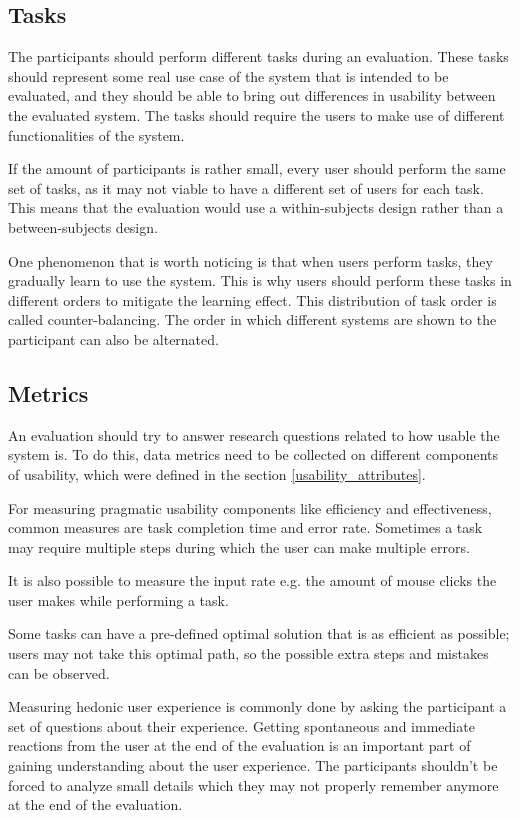 \subsection{Tasks}
The participants should perform different tasks during an evaluation. These tasks should represent some real use case of the system that is intended to be evaluated, and they should be able to bring out differences in usability between the evaluated system. The tasks should require the users to make use of different functionalities of the system.

If the amount of participants is rather small, every user should perform the same set of tasks, as it may not viable to have a different set of users for each task. This means that the evaluation would use a within-subjects design rather than a between-subjects design. 

One phenomenon that is worth noticing is that when users perform tasks, they gradually learn to use the system. This is why users should perform these tasks in different orders to mitigate the learning effect. This distribution of task order is called counter-balancing. The order in which different systems are shown to the participant can also be alternated. \cite{rubin2008handbook}

\subsection{Metrics}
An evaluation should try to answer research questions related to how usable the system is. To do this, data metrics need to be collected on different components of usability, which were defined in the section \ref{usability_attributes}.

For measuring pragmatic usability components like efficiency and effectiveness, common measures are task completion time and error rate. Sometimes a task may require multiple steps during which the user can make multiple errors. 

It is also possible to measure the input rate e.g. the amount of mouse clicks the user makes while performing a task.

Some tasks can have a pre-defined optimal solution that is as efficient as possible; users may not take this optimal path, so the possible extra steps and mistakes can be observed. \cite{hornbaek2006current}

Measuring hedonic user experience is commonly done by asking the participant a set of questions about their experience. Getting spontaneous and immediate reactions from the user at the end of the evaluation is an important part of gaining understanding about the user experience. The participants shouldn't be forced to analyze small details which they may not properly remember anymore at the end of the evaluation. \cite{laugwitz2008construction}

